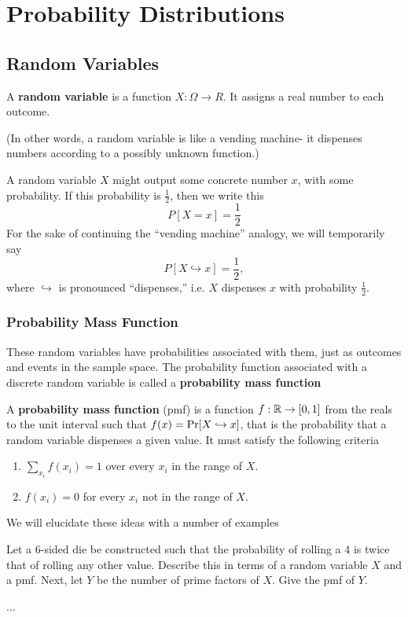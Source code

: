 \documentclass[../main.tex]{subfiles}
\begin{document}
\chapter{Probability Distributions}
\section{Random Variables}
\begin{definition}
A \textbf{random variable} is a function $X : \Omega \rightarrow R$. It assigns a real number to each outcome. 
\end{definition}
(In other words, a random variable is like a vending machine- it dispenses numbers according to a possibly unknown function.)

A random variable $X$ might output some concrete number $x$, with some probability. If this probability is $\frac 12$, then we write this
\[
	P[X = x] = \frac 12
\]
For the sake of continuing the ``vending machine'' analogy, we will temporarily say \[P[X \hookrightarrow x] = \frac 12,\] where $\hookrightarrow$ is pronounced ``dispenses,'' i.e. $X$ dispenses $x$ with probability $\frac 12$. 

\subsection{Probability Mass Function}

These random variables have probabilities associated with them, just as
outcomes and events in the sample space. The probability function
associated with a discrete random variable is called a \textbf{probability
mass function}
\begin{definition}
    A \textbf{probability mass function} (pmf) is a function  $f:\mathbb{R} \rightarrow [0,1]$ from the reals to the unit interval such that $f(x) = \mathrm{Pr}[X \hookrightarrow x]$, that is the probability that
    a random variable dispenses a given value. It must satisfy the following criteria
    \begin{enumerate}
        \item $\displaystyle \sum_{x_i} f(x_i) = 1$ over
        every $x_i$ in the range of $X$.
        \item $f(x_i) = 0$ for every $x_i$ not in the range of $X$.
    \end{enumerate}
\end{definition}
We will elucidate these ideas with a number of examples
\begin{example}
    Let a 6-sided die be constructed such that the probability of rolling
    a 4 is twice that of rolling any other value. Describe this in terms
    of a random variable  $X$ and a pmf. Next, let $Y$ be the number of
    prime factors of $X$. Give the pmf of $Y$.
\end{example}
\begin{solution}
...
\end{solution}
\end{document}
